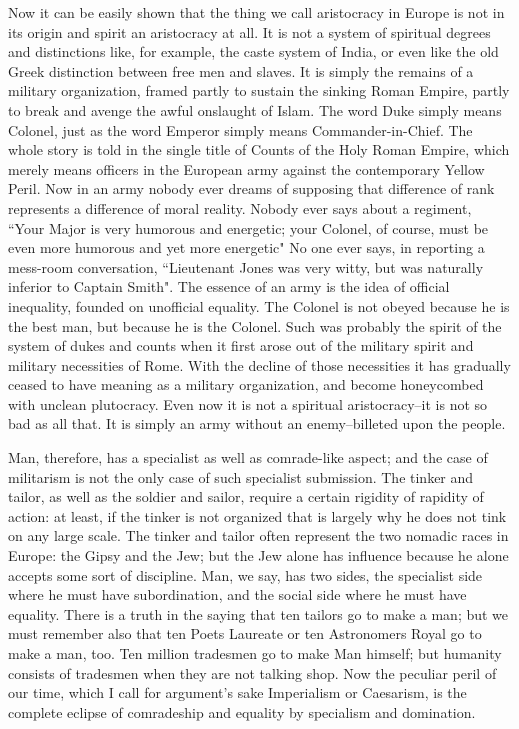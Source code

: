 \documentclass[final,10pt,letterpaper,twocolumn,openany]{book}
\begin{document}
Now it can be easily shown that the thing we call aristocracy in Europe
is not in its origin and spirit an aristocracy at all. It is not a system of
spiritual degrees and distinctions like, for example, the caste system of
India, or even like the old Greek distinction between free men and slaves.
It is simply the remains of a military organization, framed partly to sustain
the sinking Roman Empire, partly to break and avenge the awful onslaught
of Islam. The word Duke simply means Colonel, just as the word Emperor
simply means Commander-in-Chief. The whole story is told in the single
title of Counts of the Holy Roman Empire, which merely means officers in
the European army against the contemporary Yellow Peril. Now in an
army nobody ever dreams of supposing that difference of rank represents a
difference of moral reality. Nobody ever says about a regiment, ``Your
Major is very humorous and energetic; your Colonel, of course, must be
even more humorous and yet more energetic" No one ever says, in
reporting a mess-room conversation, ``Lieutenant Jones was very witty, but
was naturally inferior to Captain Smith". The essence of an army is the
idea of official inequality, founded on unofficial equality. The Colonel is
not obeyed because he is the best man, but because he is the Colonel. Such
was probably the spirit of the system of dukes and counts when it first
arose out of the military spirit and military necessities of Rome. With the
decline of those necessities it has gradually ceased to have meaning as a
military organization, and become honeycombed with unclean plutocracy.
Even now it is not a spiritual aristocracy--it is not so bad as all that. It is
simply an army without an enemy--billeted upon the people.

Man, therefore, has a specialist as well as comrade-like aspect; and the
case of militarism is not the only case of such specialist submission. The
tinker and tailor, as well as the soldier and sailor, require a certain rigidity
of rapidity of action: at least, if the tinker is not organized that is largely
why he does not tink on any large scale. The tinker and tailor often
represent the two nomadic races in Europe: the Gipsy and the Jew; but the
Jew alone has influence because he alone accepts some sort of discipline.
Man, we say, has two sides, the specialist side where he must have
subordination, and the social side where he must have equality. There is a
truth in the saying that ten tailors go to make a man; but we must
remember also that ten Poets Laureate or ten Astronomers Royal go to
make a man, too. Ten million tradesmen go to make Man himself; but
humanity consists of tradesmen when they are not talking shop. Now the
peculiar peril of our time, which I call for argument's sake Imperialism or
Caesarism, is the complete eclipse of comradeship and equality by
specialism and domination.
\end{document}
